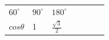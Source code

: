 {\begin{center}
\begin{xtabular*}{\mytablewidth}[t]{|p{10\mystarwidth}|p{10\mystarwidth}|p{10\mystarwidth}|p{10\mystarwidth}|p{10\mystarwidth}|p{10\mystarwidth}|p{10\mystarwidth}|}
                \begin{math}{60}^{\circ }\end{math}
               &
    
    
        
                \begin{math}{90}^{\circ }\end{math}
               &
    
    
        
                \begin{math}{180}^{\circ }\end{math}
     \tabularnewline{}
    
    
        
                \begin{math}cos\theta \end{math}
               &
    
    
        1 &
    
    
        
                \begin{math}\frac{\sqrt{3}}{2}\end{math}
               &
    

\end{xtabular*}
\end{center}}
